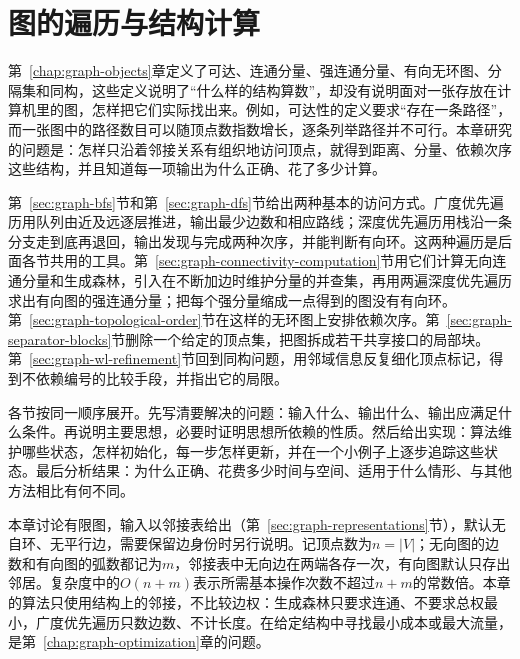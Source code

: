\chapter{图的遍历与结构计算}
\label{chap:graph-traversal}

第~\ref{chap:graph-objects}章定义了可达、连通分量、强连通分量、有向无环图、分隔集和同构，这些定义说明了“什么样的结构算数”，却没有说明面对一张存放在计算机里的图，怎样把它们实际找出来。例如，可达性的定义要求“存在一条路径”，而一张图中的路径数目可以随顶点数指数增长，逐条列举路径并不可行。本章研究的问题是：怎样只沿着邻接关系有组织地访问顶点，就得到距离、分量、依赖次序这些结构，并且知道每一项输出为什么正确、花了多少计算。

第~\ref{sec:graph-bfs}节和第~\ref{sec:graph-dfs}节给出两种基本的访问方式。广度优先遍历用队列由近及远逐层推进，输出最少边数和相应路线；深度优先遍历用栈沿一条分支走到底再退回，输出发现与完成两种次序，并能判断有向环。这两种遍历是后面各节共用的工具。第~\ref{sec:graph-connectivity-computation}节用它们计算无向连通分量和生成森林，引入在不断加边时维护分量的并查集，再用两遍深度优先遍历求出有向图的强连通分量；把每个强分量缩成一点得到的图没有有向环。第~\ref{sec:graph-topological-order}节在这样的无环图上安排依赖次序。第~\ref{sec:graph-separator-blocks}节删除一个给定的顶点集，把图拆成若干共享接口的局部块。第~\ref{sec:graph-wl-refinement}节回到同构问题，用邻域信息反复细化顶点标记，得到不依赖编号的比较手段，并指出它的局限。

各节按同一顺序展开。先写清要解决的问题：输入什么、输出什么、输出应满足什么条件。再说明主要思想，必要时证明思想所依赖的性质。然后给出实现：算法维护哪些状态，怎样初始化，每一步怎样更新，并在一个小例子上逐步追踪这些状态。最后分析结果：为什么正确、花费多少时间与空间、适用于什么情形、与其他方法相比有何不同。

本章讨论有限图，输入以邻接表给出（第~\ref{sec:graph-representations}节），默认无自环、无平行边，需要保留边身份时另行说明。记顶点数为$n=|V|$；无向图的边数和有向图的弧数都记为$m$，邻接表中无向边在两端各存一次，有向图默认只存出邻居。复杂度中的$O(n+m)$表示所需基本操作次数不超过$n+m$的常数倍。本章的算法只使用结构上的邻接，不比较边权：生成森林只要求连通、不要求总权最小，广度优先遍历只数边数、不计长度。在给定结构中寻找最小成本或最大流量，是第~\ref{chap:graph-optimization}章的问题。








